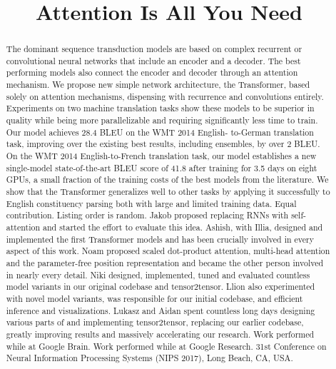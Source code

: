 \documentclass[conference]{IEEEtran}
\begin{document}
\title{Attention Is All You Need}

\author{
}

\maketitle

\begin{abstract}
The dominant sequence transduction models are based on complex recurrent or convolutional neural networks that include an encoder and a decoder. The best performing models also connect the encoder and decoder through an attention mechanism. We propose new simple network architecture, the Transformer, based solely on attention mechanisms, dispensing with recurrence and convolutions entirely. Experiments on two machine translation tasks show these models to be superior in quality while being more parallelizable and requiring significantly less time to train. Our model achieves 28.4 BLEU on the WMT 2014 English- to-German translation task, improving over the existing best results, including ensembles, by over 2 BLEU. On the WMT 2014 English-to-French translation task, our model establishes a new single-model state-of-the-art BLEU score of 41.8 after training for 3.5 days on eight GPUs, a small fraction of the training costs of the best models from the literature. We show that the Transformer generalizes well to other tasks by applying it successfully to English constituency parsing both with large and limited training data. Equal contribution. Listing order is random. Jakob proposed replacing RNNs with self-attention and started the effort to evaluate this idea. Ashish, with Illia, designed and implemented the first Transformer models and has been crucially involved in every aspect of this work. Noam proposed scaled dot-product attention, multi-head attention and the parameter-free position representation and became the other person involved in nearly every detail. Niki designed, implemented, tuned and evaluated countless model variants in our original codebase and tensor2tensor. Llion also experimented with novel model variants, was responsible for our initial codebase, and efficient inference and visualizations. Lukasz and Aidan spent countless long days designing various parts of and implementing tensor2tensor, replacing our earlier codebase, greatly improving results and massively accelerating our research. Work performed while at Google Brain. Work performed while at Google Research. 31st Conference on Neural Information Processing Systems (NIPS 2017), Long Beach, CA, USA.
\end{abstract}
\end{document}
